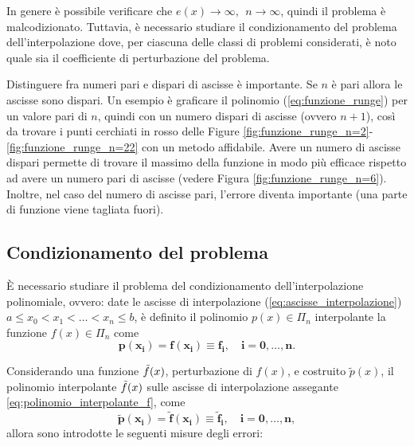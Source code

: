 In genere è possibile verificare che $e(x)\rightarrow\infty,\;\, n\rightarrow\infty$, quindi il problema è malcodizionato. Tuttavia, è necessario studiare il condizionamento del problema dell'interpolazione dove, per ciascuna delle classi di problemi considerati, è noto quale sia il coefficiente di perturbazione del problema.

\begin{remark}
	Distinguere fra numeri pari e dispari di ascisse è importante. Se $n$ è pari allora  le ascisse sono dispari. Un esempio è graficare il polinomio (\ref{eq:funzione_runge}) per un valore pari di $n$, quindi con un numero dispari di ascisse (ovvero $n+1$), così da trovare i punti cerchiati in rosso delle Figure \ref{fig:funzione_runge_n=2}-\ref{fig:funzione_runge_n=22} con un metodo affidabile.  Avere un numero di ascisse dispari permette di trovare il massimo della funzione in modo più efficace rispetto ad avere un numero pari di ascisse (vedere Figura \ref{fig:funzione_runge_n=6}). Inoltre, nel caso del numero di ascisse pari, l'errore diventa importante (una parte di funzione viene tagliata fuori).
\end{remark}

\subsection{Condizionamento del problema}\label{ssec:condizionamento_problema_approsimazione_funzione}
È necessario studiare il problema del condizionamento dell'interpolazione polinomiale, ovvero: date le ascisse di interpolazione (\ref{eq:ascisse_interpolazione}) $a\leq x_0<x_1<\hdots<x_n\leq b$, è definito il polinomio $p(x)\in\Pi_n$ interpolante la funzione $f(x)\in\Pi_n$ come
\begin{equation}\label{eq:polinomio_interpolante_f}
	\boldsymbol{p(x_i)=f(x_i)\equiv f_i},\quad\boldsymbol{i=0,\hdots,n}.
\end{equation}

Considerando una funzione $\Tilde{f}(x)$, perturbazione di $f(x)$, e costruito $\tilde{p}(x)$, il polinomio interpolante $\Tilde{f}(x)$ sulle ascisse di interpolazione assegante \ref{eq:polinomio_interpolante_f}, come
\begin{equation}\label{eq:polinomio_interpolante_perturbazione_f}
	\boldsymbol{\tilde{p}(x_i)=\tilde{f}(x_i)\equiv\tilde{f}_i,\quad i=0,\hdots,n},
\end{equation}
allora sono introdotte le seguenti misure degli errori:

